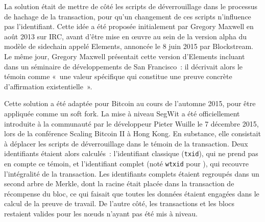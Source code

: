 La solution était de mettre de côté les scripts de déverrouillage dans le processus de hachage de la transaction, pour qu'un changement de ces scripts n'influence pas l'identifiant. Cette idée a été proposée initialement par Gregory Maxwell en août 2013 sur IRC, avant d'être mise en œuvre au sein de la version alpha du modèle de sidechain appelé Elements, annoncée le 8 juin 2015 par Blockstream. Le même jour, Gregory Maxwell présentait cette version d'Elements incluant  dans un séminaire de développements de San Francisco~: il décrivait alors le témoin comme «~une valeur spécifique qui constitue une preuve concrète d'affirmation existentielle~».


Cette solution a été adaptée pour Bitcoin au cours de l'automne 2015, pour être appliquée comme un soft fork. La mise à niveau SegWit a été officiellement introduite à la communauté par le développeur Pieter Wuille le 7 décembre 2015, lors de la conférence Scaling Bitcoin \textsc{II} à Hong Kong. En substance, elle consistait à déplacer les scripts de déverrouillage dans le témoin de la transaction. Deux identifiants étaient alors calculés~: l'identifiant classique (\texttt{txid}), qui ne prend pas en compte ce témoin, et l'identifiant complet (noté \texttt{wtxid} pour ), qui recouvre l'intégralité de la transaction. Les identifiants complets étaient regroupés dans un second arbre de Merkle, dont la racine était placée dans la transaction de récompense du bloc, ce qui faisait que toutes les données étaient engagées dans le calcul de la preuve de travail. De l'autre côté, les transactions et les blocs restaient valides pour les nœuds n'ayant pas été mis à niveau.

